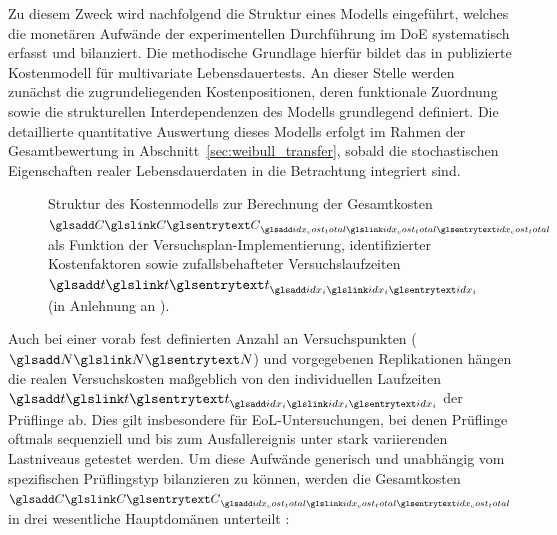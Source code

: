 Zu diesem Zweck wird nachfolgend die Struktur eines Modells eingeführt, welches die monetären Aufwände der experimentellen Durchführung im \ac{DoE} systematisch erfasst und bilanziert.
Die methodische Grundlage hierfür bildet das in \textcite{Arndt.2025} publizierte Kostenmodell für multivariate Lebensdauertests.
An dieser Stelle werden zunächst die zugrundeliegenden Kostenpositionen, deren funktionale Zuordnung sowie die strukturellen Interdependenzen des Modells grundlegend definiert.
Die detaillierte quantitative Auswertung dieses Modells erfolgt im Rahmen der Gesamtbewertung in Abschnitt~\ref{sec:weibull_transfer}, sobald die stochastischen Eigenschaften realer Lebensdauerdaten in die Betrachtung integriert sind.
\begin{figure}[htbp]
    \centering
    \def\svgwidth{0.5\textwidth}
    
    \caption{Struktur des Kostenmodells zur Berechnung der Gesamtkosten $\sym{C}_{\sym{idx_cost_total}}$ als Funktion der Versuchsplan-Implementierung, identifizierter Kostenfaktoren sowie zufallsbehafteter Versuchslaufzeiten $\sym{t}_{\sym{idx_i}}$ (in Anlehnung an \cite{Arndt.2023b}).}
    \label{fig:cost_model_structure}
\end{figure}
Auch bei einer vorab fest definierten Anzahl an Versuchspunkten ($\sym{N}$) und vorgegebenen Replikationen hängen die realen Versuchskosten maßgeblich von den individuellen Laufzeiten $\sym{t}_{\sym{idx_i}}$ der Prüflinge ab.
Dies gilt insbesondere für \ac{EoL}-Un\-ter\-such\-ung\-en, bei denen Prüflinge oftmals sequenziell und bis zum Ausfallereignis unter stark variierenden Lastniveaus getestet werden.
Um diese Aufwände generisch und unabhängig vom spezifischen Prüflingstyp bilanzieren zu können, werden die Gesamtkosten $\sym{C}_{\sym{idx_cost_total}}$ in drei wesentliche Hauptdomänen unterteilt \cite{Arndt.2025}:

